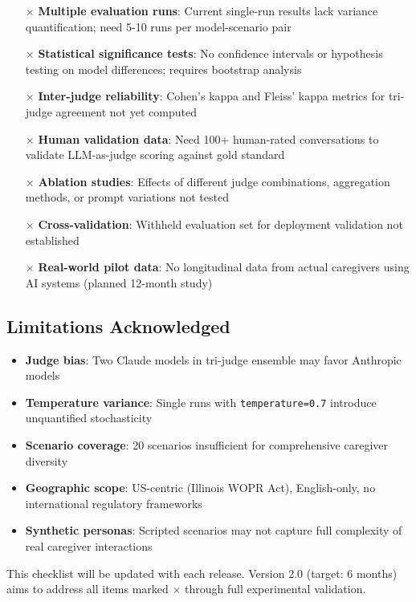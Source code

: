 \documentclass{article}%
\begin{document}
\begin{itemize}
    \item[$\times$] \textbf{Multiple evaluation runs}: Current single-run results lack variance quantification; need 5-10 runs per model-scenario pair
    \item[$\times$] \textbf{Statistical significance tests}: No confidence intervals or hypothesis testing on model differences; requires bootstrap analysis
    \item[$\times$] \textbf{Inter-judge reliability}: Cohen's kappa and Fleiss' kappa metrics for tri-judge agreement not yet computed
    \item[$\times$] \textbf{Human validation data}: Need 100+ human-rated conversations to validate LLM-as-judge scoring against gold standard
    \item[$\times$] \textbf{Ablation studies}: Effects of different judge combinations, aggregation methods, or prompt variations not tested
    \item[$\times$] \textbf{Cross-validation}: Withheld evaluation set for deployment validation not established
    \item[$\times$] \textbf{Real-world pilot data}: No longitudinal data from actual caregivers using AI systems (planned 12-month study)
\end{itemize}

\subsection{Limitations Acknowledged}%

\begin{itemize}
    \item \textbf{Judge bias}: Two Claude models in tri-judge ensemble may favor Anthropic models
    \item \textbf{Temperature variance}: Single runs with \texttt{temperature=0.7} introduce unquantified stochasticity
    \item \textbf{Scenario coverage}: 20 scenarios insufficient for comprehensive caregiver diversity
    \item \textbf{Geographic scope}: US-centric (Illinois WOPR Act), English-only, no international regulatory frameworks
    \item \textbf{Synthetic personas}: Scripted scenarios may not capture full complexity of real caregiver interactions
\end{itemize}

This checklist will be updated with each release. Version 2.0 (target: 6 months) aims to address all items marked $\times$ through full experimental validation.

%


\end{document}

